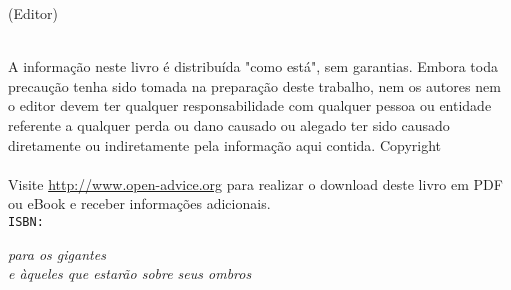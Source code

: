 \thispagestyle{empty}
\booktitle
\newpage
\newpage
\begin{titlepage}
\begin{flushright}
\bookeditor{} (Editor)\\
\vspace{10em}
{\Huge\bfseries\sffamily\booktitle}\\
\vspace{2em}
{\normalsize\sffamily\booksubtitle}
\end{flushright}
\end{titlepage}
\thispagestyle{empty}
A informação neste livro é distribuída "como está", sem garantias. Embora toda precaução tenha sido tomada na preparação deste trabalho, nem os autores nem o editor devem ter qualquer responsabilidade com qualquer pessoa ou entidade referente a qualquer perda ou dano causado ou alegado ter sido causado diretamente ou indiretamente pela informação aqui contida.%
\vfill
Copyright \textcopyright{} \bookyear{} \bookauthors\\
\newline
{}
\newline \\
Visite \url{http://www.open-advice.org} para realizar o download deste livro em PDF ou eBook e receber informações adicionais.
\newline \\
{\tt ISBN: \bookisbn}%
\newpage
\thispagestyle{empty}
\vspace*{2cm}
\begin{flushright}
{\Large\itshape para os gigantes\\e àqueles que estarão sobre seus ombros}\\
\end{flushright}
\newpage
\thispagestyle{empty}
\mbox{}
\newpage
